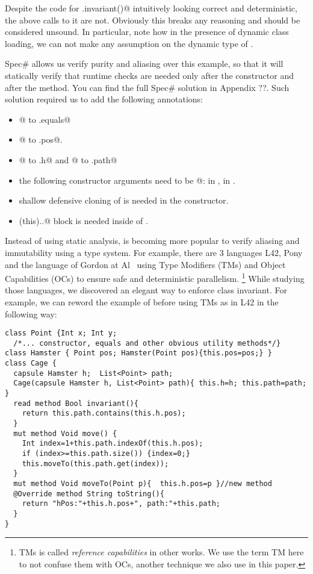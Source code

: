 Despite the code for \Q@Cage.invariant()@ intuitively looking correct and deterministic, the above calls to it are not. Obviously this breaks any reasoning and should be considered unsound. 
In particular, note how in the presence of dynamic class loading, 
we can not make any assumption on the dynamic type of \Q@path@.

Spec\# allows us verify purity and aliasing over this example, so that
it will statically verify that runtime checks are needed only
after the constructor and after the \Q@move@ method.
You can find the
full Spec\# solution in Appendix ??. Such solution required us to add
the following annotations:
\begin{itemize}
\item {}@ to \Q@Point.equals@
\item \Q@[Peer]@ to \Q@Hamster.pos@.
\item \Q@[Rep]@ to \Q@Cage.h@ and @ to \Q@Cage.path@
\item the following constructor arguments need to be \Q@[Captured]@:
\Q@Point@ in \Q@Hamster@, \Q@Hamster@ in \Q@Cage@.
\item shallow defensive cloning of \Q@path@ is needed in the \Q@Cage@ constructor.
\item\Q@expose(this){..}@ block is needed inside of \Q@move@.
\end{itemize}

Instead of using static analysis, 
is becoming more popular to verify aliasing and immutability using a type system.
For example, there are 3 languages L42, Pony and the language of Gordon at Al~\cite{}
using Type Modifiers (TMs) and Object Capabilities (OCs) to ensure safe and deterministic parallelism.%
\footnote{TMs is called \emph{reference capabilities} in other works. We use the term TM here
to not confuse them with OCs, another technique we also use in this paper.}
While studying those languages, we discovered an elegant way to enforce class invariant.
For example, we can reword the example of before using TMs as in L42 in the following way:
\begin{lstlisting}
class Point {Int x; Int y;
  /*... constructor, equals and other obvious utility methods*/}
class Hamster { Point pos; Hamster(Point pos){this.pos=pos;} }
class Cage {
  capsule Hamster h;  List<Point> path;
  Cage(capsule Hamster h, List<Point> path){ this.h=h; this.path=path; }
  read method Bool invariant(){
    return this.path.contains(this.h.pos);
  }
  mut method Void move() {
    Int index=1+this.path.indexOf(this.h.pos);
    if (index>=this.path.size()) {index=0;}
    this.moveTo(this.path.get(index));
  }
  mut method Void moveTo(Point p){  this.h.pos=p }//new method
  @Override method String toString(){
    return "hPos:"+this.h.pos+", path:"+this.path;
  }
}
\end{lstlisting}

